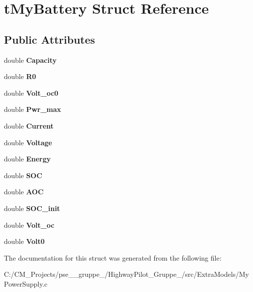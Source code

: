\hypertarget{structt_my_battery}{}\section{t\+My\+Battery Struct Reference}
\label{structt_my_battery}
\subsection*{Public Attributes}
\begin{DoxyCompactItemize}
\item 
\mbox{\label{structt_my_battery_abd38cfa37d24473a5f1a9ba8a6cd4a8f}} 
double {\bfseries Capacity}
\item 
\mbox{\label{structt_my_battery_aa51e67b935890aecd522e20e446efcbf}} 
double {\bfseries R0}
\item 
\mbox{\label{structt_my_battery_a3cd5746a390f3dc813601ef1c2ae4243}} 
double {\bfseries Volt\+\_\+oc0}
\item 
\mbox{\label{structt_my_battery_a977f48c5837de0ea9e86dd2ca6661478}} 
double {\bfseries Pwr\+\_\+max}
\item 
\mbox{\label{structt_my_battery_a59c719e0fe1444c407db49c66dfa9dcd}} 
double {\bfseries Current}
\item 
\mbox{\label{structt_my_battery_a89f909a23cdaacd54d9e3918923da436}} 
double {\bfseries Voltage}
\item 
\mbox{\label{structt_my_battery_a8d1845b0a1fa0f193669668e558be1ff}} 
double {\bfseries Energy}
\item 
\mbox{\label{structt_my_battery_a96777a074d095099f05e84af087c2d52}} 
double {\bfseries S\+OC}
\item 
\mbox{\label{structt_my_battery_a932a07e2d5d2e3a26e046bbcca0ddf38}} 
double {\bfseries A\+OC}
\item 
\mbox{\label{structt_my_battery_a04427d81b4037051c6beb208089c2a45}} 
double {\bfseries S\+O\+C\+\_\+init}
\item 
\mbox{\label{structt_my_battery_a75604565d9753d2d612d7f6c1a2dd825}} 
double {\bfseries Volt\+\_\+oc}
\item 
\mbox{\label{structt_my_battery_a955cb81e6ce1205276332ace4b4f5df9}} 
double {\bfseries Volt0}
\end{DoxyCompactItemize}


The documentation for this struct was generated from the following file\+:\begin{DoxyCompactItemize}
\item 
C\+:/\+C\+M\+\_\+\+Projects/pse\+\_\+\_\+gruppe\+\_/\+Highway\+Pilot\+\_\+\+Gruppe\+\_/src/\+Extra\+Models/My\+Power\+Supply.\+c\end{DoxyCompactItemize}
